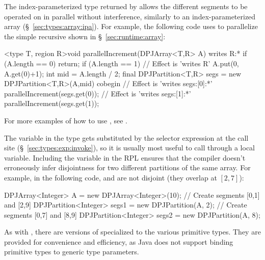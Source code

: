 The index-parameterized type returned by  allows the
different segments to be operated on in parallel without interference,
similarly to an index-parameterized array
(\S~\ref{sec:types:array:ipa}).  For example, the following code uses
 to parallelize the simple recursive 
shown in \S~\ref{sec:runtime:array}:
%
\begin{dpjlisting}
<type T, region R>void parallelIncrement(DPJArray<T,R> A) 
  writes R:* {
    if (A.length == 0) return;
    if (A.length == 1) {
        // Effect is 'writes R'
        A.put(0, A.get(0)+1);
    }
    int mid = A.length / 2;
    final DPJPartition<T,R> segs = new DPJPartition<T,R>(A,mid)
    cobegin {
        // Effect is 'writes segs:[0]:*'
        parallelIncrement(segs.get(0));
        // Effect is 'writes segs:[1]:*'
        parallelIncrement(segs.get(1));
    }
}
\end{dpjlisting}
%
For more examples of how to use , see \tutorial.

The variable  in the type gets substituted by the selector
expression at the call site (\S~\ref{sec:types:exp:invoke}), so it is
usually most useful to call  through a  local
variable.  Including the variable in the RPL ensures that the compiler
doesn't erroneously infer disjointness for two different partitions of
the same array.  For example, in the following code,
 and  are not disjoint (they
overlap at $[2,7]$):
%
\begin{dpjlisting}
DPJArray<Integer> A = new DPJArray<Integer>(10);
// Create segments [0,1] and [2,9]
DPJPartition<Integer> segs1 = new DPJPartition(A, 2);
// Create segments [0,7] and [8,9]
DPJPartition<Integer> segs2 = new DPJPartition(A, 8);
\end{dpjlisting}

 As with ,
there are versions of  specialized to the various
primitive types.  They are provided for convenience and efficiency, as
Java does not support binding primitive types to generic type
parameters.



